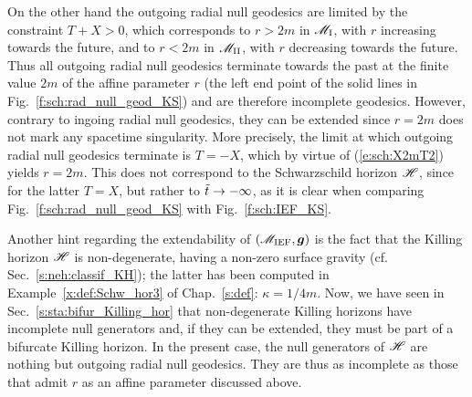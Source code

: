 On the other hand the outgoing radial null geodesics are limited by
the constraint $T+X > 0$, which corresponds to $r>2m$ in $\mathscr{M}_{\rm I}$, with $r$ increasing towards
the future, and to
$r<2m$ in $\mathscr{M}_{\rm II}$, with $r$ decreasing towards the future.
Thus all outgoing radial null geodesics terminate towards the past at the finite
value $2m$ of the affine parameter $r$
(the left end point of the solid lines in Fig.~\ref{f:sch:rad_null_geod_KS}) and are therefore incomplete geodesics.
However, contrary to ingoing radial null geodesics, they can be extended
since $r=2m$ does not mark any spacetime singularity.
More precisely, the limit at which outgoing radial null geodesics
terminate is $T=-X$, which by virtue of (\ref{e:sch:X2mT2}) yields $r=2m$.
This does not correspond to the Schwarzschild horizon $\mathscr{H}$, since for
the latter $T=X$, but rather to ${\tilde t}\rightarrow-\infty$,
as it is clear when comparing Fig.~\ref{f:sch:rad_null_geod_KS}
with Fig.~\ref{f:sch:IEF_KS}.

Another hint regarding the extendability of $(\mathscr{M}_{\rm IEF}, \bm{g})$
is the fact that the Killing horizon $\mathscr{H}$ is non-degenerate, having
a non-zero surface gravity (cf. Sec.~\ref{s:neh:classif_KH}); the latter
has been computed in Example~\ref{x:def:Schw_hor3} of Chap.~\ref{s:def}:
$\kappa = 1/4m$. Now, we have seen in Sec.~\ref{s:sta:bifur_Killing_hor}
that non-degenerate Killing horizons have incomplete null generators
and, if they can be extended, they must be part of a
bifurcate Killing horizon. In the present case, the null generators of $\mathscr{H}$
are nothing but outgoing radial null geodesics. They are thus as incomplete
as those that admit $r$ as an affine parameter discussed above.

